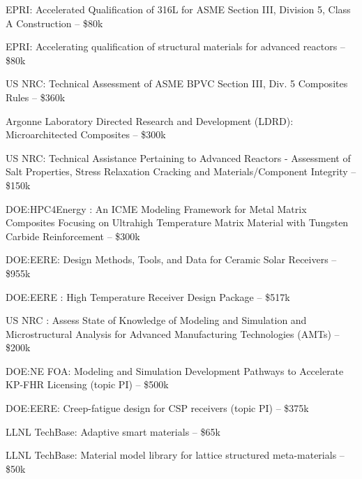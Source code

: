 EPRI:  Accelerated Qualification of 316L for ASME Section III, Division 5, Class A Construction -- \$80k 

EPRI:  Accelerating qualification of structural materials for advanced reactors -- \$80k 

US NRC:  Technical Assessment of ASME BPVC Section III, Div. 5 Composites Rules -- \$360k

Argonne Laboratory Directed Research and Development (LDRD):  Microarchitected Composites -- \$300k

US NRC:  Technical Assistance Pertaining to Advanced Reactors - Assessment of Salt Properties, Stress Relaxation Cracking and Materials/Component Integrity -- \$150k

DOE:HPC4Energy : An ICME Modeling Framework for Metal Matrix Composites Focusing on Ultrahigh Temperature Matrix Material with Tungsten Carbide Reinforcement -- \$300k

DOE:EERE:  Design Methods, Tools, and Data for Ceramic Solar Receivers -- \$955k

DOE:EERE : High Temperature Receiver Design Package -- \$517k

US NRC : Assess State of Knowledge of Modeling and Simulation and Microstructural Analysis for Advanced Manufacturing Technologies (AMTs) -- \$200k

DOE:NE FOA:  Modeling and Simulation Development Pathways to Accelerate KP-FHR Licensing (topic PI) -- \$500k

DOE:EERE:  Creep-fatigue design for CSP receivers (topic PI) -- \$375k

LLNL TechBase:  Adaptive smart materials -- \$65k

LLNL TechBase:  Material model library for lattice structured meta-materials -- \$50k

\extra


\nocite{*}


\printbibliography[keyword=refereed,heading=none]


\printbibliography[keyword=pending,heading=none]


\printbibliography[keyword=conf,heading=none]


\printbibliography[keyword=patents,heading=none]


\printbibliography[keyword=nonref,heading=none]


\printbibliography[keyword=invited,heading=none]



